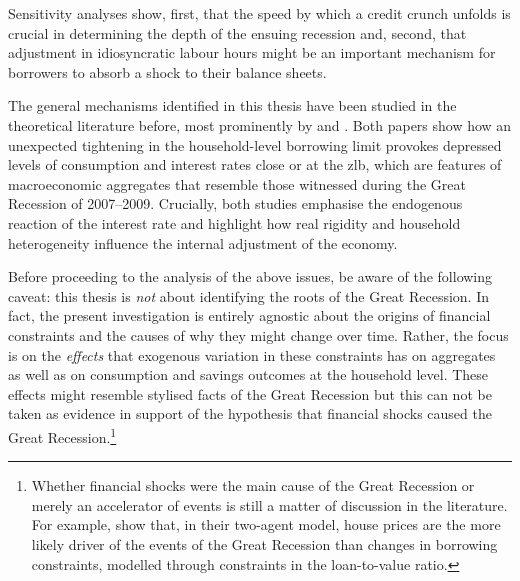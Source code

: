 \documentclass[12pt]{article} %
\numberwithin{equation}{section} %
\numberwithin{figure}{section}
\numberwithin{table}{section}
\begin{document}
Sensitivity analyses show, first, that the speed by which a credit crunch unfolds is crucial in determining the depth of the ensuing recession and, second, that adjustment in idiosyncratic labour hours might be an important mechanism for borrowers to absorb a shock to their balance sheets.


The general mechanisms identified in this thesis have been studied in the theoretical literature before, most prominently by \textcite{egg2012} and \textcite{gl2017}. Both papers show how an unexpected tightening in the household-level borrowing limit provokes depressed levels of consumption and interest rates close or at the \Gls{zlb}, which are features of macroeconomic aggregates that resemble those witnessed during the Great Recession of 2007--2009. Crucially, both studies emphasise the endogenous reaction of the interest rate and highlight how real rigidity and household heterogeneity influence the internal adjustment of the economy.

Before proceeding to the analysis of the above issues, be aware of the following caveat: this thesis is \textit{not} about identifying the roots of the Great Recession. In fact, the present investigation is entirely agnostic about the origins of financial constraints and the causes of why they might change over time. Rather, the focus is on the \textit{effects} that exogenous variation in these constraints has on aggregates as well as on consumption and savings outcomes at the household level. These effects might resemble stylised facts of the Great Recession but this can not be taken as evidence in support of the hypothesis that financial shocks caused the Great Recession.\footnote{Whether financial shocks were the main cause of the Great Recession or merely an accelerator of events is still a matter of discussion in the literature. For example, \textcite{justiniano2015} show that, in their two-agent model, house prices are the more likely driver of the events of the Great Recession than changes in borrowing constraints, modelled through constraints in the loan-to-value ratio.} %
\end{document}
